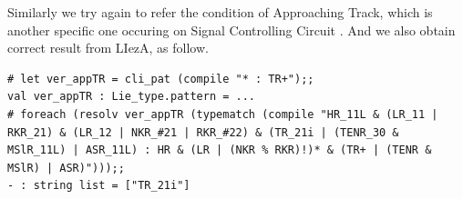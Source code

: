 \documentclass[12pt]{article}
\begin{document}
Similarly we try again to refer the condition of Approaching Track, which is
another specific one occuring on Signal Controlling Circuit . And we also
obtain correct result from LIezA, as follow.
\begin{verbatim}
# let ver_appTR = cli_pat (compile "* : TR+");;
val ver_appTR : Lie_type.pattern = ...
# foreach (resolv ver_appTR (typematch (compile "HR_11L & (LR_11 |
RKR_21) & (LR_12 | NKR_#21 | RKR_#22) & (TR_21i | (TENR_30 &
MSlR_11L) | ASR_11L) : HR & (LR | (NKR % RKR)!)* & (TR+ | (TENR &
MSlR) | ASR)")));;
- : string list = ["TR_21i"]
\end{verbatim}
\end{document}
